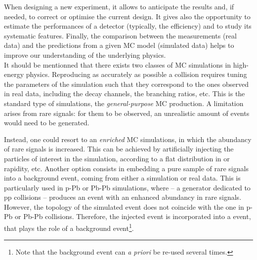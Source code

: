 When designing a new experiment, it allows to anticipate the results and, if needed, to correct or optimise the current design. It gives also the opportunity to estimate the performances of a detector (typically, the efficiency) and to study its systematic features. Finally, the comparison between the measurements (real data) and the predictions from a given MC model (simulated data) helps to improve our understanding of the underlying physics.\\

It should be mentionned that there exists two classes of MC simulations in high-energy physics. Reproducing as accurately as possible a collision requires tuning the parameters of the simulation such that they correspond to the ones observed in real data, including the decay channels, the branching ratios, etc. This is the standard type of simulations, the \textit{general-purpose} MC production. A limitation arises from rare signals: for them to be observed, an unrealistic amount of events would need to be generated. 

Instead, one could resort to an \textit{enriched} MC simulations, in which the abundancy of rare signals is increased. This can be achieved by artificially injecting the particles of interest in the simulation, according to a flat distribution in \pT or rapidity, etc. Another option consists in embedding a pure sample of rare signals into a background event, coming from either a simulation or real data. This is particularly used in p-Pb or Pb-Pb simulations, where \Pythia -- a generator dedicated to pp collisions -- produces an event with an enhanced abundancy in rare signals. However, the topology of the simulated event does not coincide with the one in p-Pb or Pb-Pb collisions. Therefore, the injected event is incorporated into a \Hijing event, that plays the role of a background event\footnote{Note that the background event can \textit{a priori} be re-used several times.}.